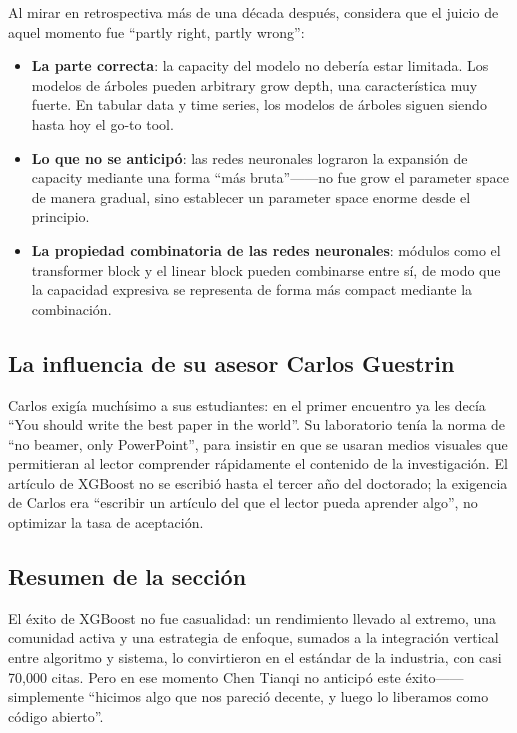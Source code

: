 Al mirar en retrospectiva más de una década después, considera que el juicio de aquel momento fue ``partly right, partly wrong'':

\begin{itemize}
    \item \textbf{La parte correcta}: la capacity del modelo no debería estar limitada. Los modelos de árboles pueden arbitrary grow depth, una característica muy fuerte. En tabular data y time series, los modelos de árboles siguen siendo hasta hoy el go-to tool.
    \item \textbf{Lo que no se anticipó}: las redes neuronales lograron la expansión de capacity mediante una forma ``más bruta''------no fue grow el parameter space de manera gradual, sino establecer un parameter space enorme desde el principio.
    \item \textbf{La propiedad combinatoria de las redes neuronales}: módulos como el transformer block y el linear block pueden combinarse entre sí, de modo que la capacidad expresiva se representa de forma más compact mediante la combinación.
\end{itemize}

\subsection{La influencia de su asesor Carlos Guestrin}

Carlos exigía muchísimo a sus estudiantes: en el primer encuentro ya les decía ``You should write the best paper in the world''. Su laboratorio tenía la norma de ``no beamer, only PowerPoint'', para insistir en que se usaran medios visuales que permitieran al lector comprender rápidamente el contenido de la investigación. El artículo de XGBoost no se escribió hasta el tercer año del doctorado; la exigencia de Carlos era ``escribir un artículo del que el lector pueda aprender algo'', no optimizar la tasa de aceptación.

\subsection{Resumen de la sección}

El éxito de XGBoost no fue casualidad: un rendimiento llevado al extremo, una comunidad activa y una estrategia de enfoque, sumados a la integración vertical entre algoritmo y sistema, lo convirtieron en el estándar de la industria, con casi 70,000 citas. Pero en ese momento Chen Tianqi no anticipó este éxito------simplemente ``hicimos algo que nos pareció decente, y luego lo liberamos como código abierto''.
